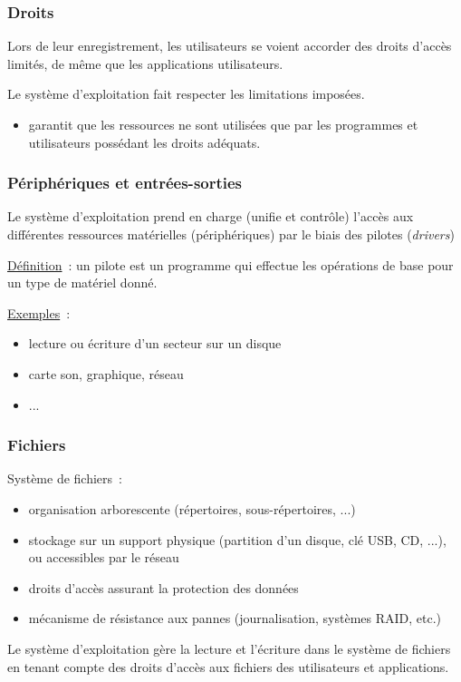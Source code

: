 \begin{frame}
\frametitle{Droits}
 Lors de leur enregistrement, les utilisateurs se voient accorder des
\alert{droits d'accès} limités, de même que les applications utilisateurs.\\
\vspace{0.5cm}

Le système d'exploitation fait respecter les limitations imposées.
\begin{itemize}
\item garantit que les ressources ne sont utilisées que par les programmes et
utilisateurs possédant les droits adéquats.
\end{itemize}
\end{frame}

\begin{frame}
  \frametitle{Périphériques et entrées-sorties}
  Le système d'exploitation prend en charge (unifie et contrôle) l'accès aux différentes ressources
  matérielles (périphériques) par le biais des \alert{pilotes} (\emph{drivers})
  \vspace{0.5cm}
  
  \underline{Définition}~: un pilote est un programme qui effectue les opérations de base
  pour \alert{un type de matériel donné}.
  \vspace{0.5cm}
  
  \underline{Exemples}~:
  \begin{itemize}
  \item lecture ou écriture d'un secteur sur un disque
  \item carte son, graphique, réseau
  \item ...
  \end{itemize}
\end{frame}

\begin{frame}
\frametitle{Fichiers}
\alert{Système de fichiers}~: 
\begin{itemize}
\item organisation arborescente (répertoires, sous-répertoires, ...)
\item stockage sur un \alert{support physique} (partition d'un disque, clé
    USB, CD, ...), ou accessibles par le réseau
  \item droits d'accès assurant la protection des données
  \item mécanisme de résistance aux pannes (journalisation, systèmes RAID, etc.)
\end{itemize}
\vspace{0.5cm}
Le système d'exploitation gère la lecture et l'écriture dans le système de fichiers
en tenant compte des droits d'accès aux fichiers des utilisateurs et applications.
\end{frame}


